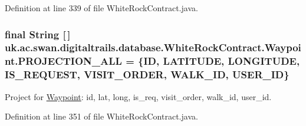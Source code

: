 Definition at line 339 of file White\+Rock\+Contract.\+java.

\hypertarget{classuk_1_1ac_1_1swan_1_1digitaltrails_1_1database_1_1_white_rock_contract_1_1_waypoint_a25cdbc9a6b814bd5b8e73a479a169a89}{
\subsubsection[{P\+R\+O\+J\+E\+C\+T\+I\+O\+N\+\_\+\+A\+L\+L}]{\setlength{\rightskip}{0pt plus 5cm}final String \mbox{[}$\,$\mbox{]} uk.\+ac.\+swan.\+digitaltrails.\+database.\+White\+Rock\+Contract.\+Waypoint.\+P\+R\+O\+J\+E\+C\+T\+I\+O\+N\+\_\+\+A\+L\+L = \{I\+D, L\+A\+T\+I\+T\+U\+D\+E, L\+O\+N\+G\+I\+T\+U\+D\+E, I\+S\+\_\+\+R\+E\+Q\+U\+E\+S\+T, V\+I\+S\+I\+T\+\_\+\+O\+R\+D\+E\+R, W\+A\+L\+K\+\_\+\+I\+D, U\+S\+E\+R\+\_\+\+I\+D\}\hspace{0.3cm}{\ttfamily [static]}}}\label{classuk_1_1ac_1_1swan_1_1digitaltrails_1_1database_1_1_white_rock_contract_1_1_waypoint_a25cdbc9a6b814bd5b8e73a479a169a89}


Project for \hyperlink{classuk_1_1ac_1_1swan_1_1digitaltrails_1_1database_1_1_white_rock_contract_1_1_waypoint}{Waypoint}\+: id, lat, long, is\+\_\+req, visit\+\_\+order, walk\+\_\+id, user\+\_\+id. 



Definition at line 351 of file White\+Rock\+Contract.\+java.

